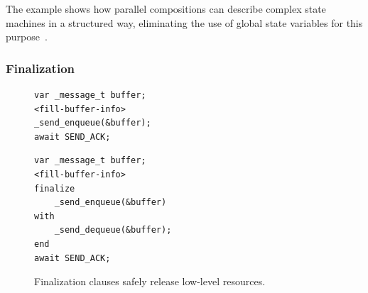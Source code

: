 \documentclass{acm_proc_article-sp}
\newcommand{\1}{\;}
\newcommand{\2}{\;\;}
\newcommand{\3}{\;\;\;}
\newcommand{\5}{\;\;\;\;\;}
\begin{document}
The example shows how parallel compositions can describe complex state machines 
in a structured way, eliminating the use of global state variables for this 
purpose~\cite{ceu.sensys13}.

\subsubsection{Finalization}

\begin{figure}[t]
\begin{minipage}[t]{0.45\linewidth}
\begin{lstlisting}
var _message_t buffer;
<fill-buffer-info>
_send_enqueue(&buffer);
await SEND_ACK;
\end{lstlisting}
\end{minipage}
%
\begin{minipage}[t]{0.50\linewidth}
\begin{lstlisting}
var _message_t buffer;
<fill-buffer-info>
finalize
    _send_enqueue(&buffer)
with
    _send_dequeue(&buffer);
end
await SEND_ACK;
\end{lstlisting}
\end{minipage}
\caption{ Finalization clauses safely release low-level resources.
\label{lst.fin}
}
\end{figure}
\end{document}
